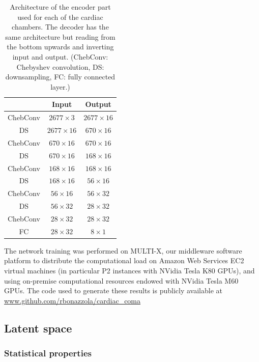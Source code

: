\documentclass[fleqn,10pt]{wlscirep}
\begin{document}
\begin{table}
\begin{center}
\begin{tabular}{|c|c|c|}
\hline
          & \textbf{Input} & \textbf{Output} \\ \hline
ChebConv  & $2677\times 3$ &  $2677\times 16$ \\ \hline
DS        & $2677\times 16$ & $670\times 16$ \\ \hline
ChebConv  & $670\times 16$ & $670\times 16$ \\ \hline
DS        & $670\times 16$ & $168\times 16$ \\ \hline
ChebConv  & $168\times 16$ & $168\times 16$ \\ \hline
DS        & $168\times 16$ & $56\times 16$\\ \hline
ChebConv  & $56\times 16$ &  $56\times 32$\\ \hline
DS        & $56\times 32$ &  $28\times 32$\\ \hline
ChebConv  & $28\times 32$ &  $28\times 32$\\ \hline
FC        & $28\times 32$ &  $8\times 1$\\ \hline
\end{tabular}
\end{center}
\caption{Architecture of the encoder part used for each of the cardiac chambers. The decoder has the same architecture but reading from the bottom upwards and inverting input and output. (ChebConv: Chebyshev convolution, DS: downsampling, FC: fully connected layer.)}
\label{table:AE_arch}
\end{table}

The network training was performed on MULTI-X, our middleware software platform to distribute the computational load on Amazon Web Services EC2 virtual machines (in particular P2 instances with NVidia Tesla K80 GPUs), and using on-premise computational resources endowed with NVidia Tesla M60 GPUs. The code used to generate these results is publicly available at \url{www.github.com/rbonazzola/cardiac\_coma} %

\subsection{Latent space}

\subsubsection{Statistical properties}
\end{document}
